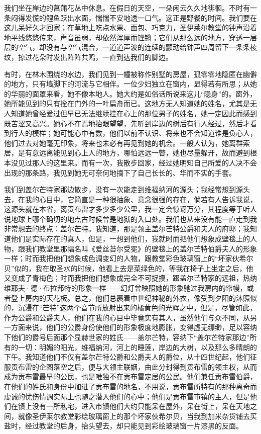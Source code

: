 \par 我们坐在岸边的菖蒲花丛中休息。在假日的天空，一朵闲云久久地徘徊。不时有一条闷得发慌的鲤鱼跃出水面，惴惴不安地透一口气。这正是野餐的时间。我们要在这儿呆好久才回家；在草地上吃点水果、面包、巧克力，圣伊莱尔教堂的钟声沿着地平线悠悠传来，声音虽弱，却依然浑厚而铿锵；它们从那么远的地方，穿透一层层的空气，却没有与空气混合，一道道声波的连续的颤动给钟声四周留下一条条棱纹，掠过花朵时发出阵阵共鸣，一直到达我们的脚边。
\par 有时，在林木围绕的水边，我们见到一幢被称作别墅的房屋，孤零零地隐匿在幽僻的地方，只有墙脚下的河流与它相伴。一位少妇独立在窗内，显得若有所思；从她的华丽的面罩来看，她不像本地人。她大约是如俗话所说来这儿“隐身”的。窗外，她所能见到的只有拴在门外的一叶扁舟而已。这地方无人知道她的姓名，尤其是无人知道她曾经爱过但早已无法继续挂在心上的那位男子的姓名，她一定因此而感到既苦涩又高兴。她心不在焉地抬眼望望，先听到岸边的树后有行人经过，然后才看到行人的模样；她可能心中有数，他们以前不认识、将来也不会知道谁是负心人，他们过去对她毫无印象，将来也未必有再见到她的机会。一般人认为，她离群索居，是有意远离能见到心上人的地方，哪怕远远一瞥，她也尽量躲开，故而避到根本没见过那人的这里来。而有一次，我散步回家，经过她明知自己所爱的人决不会出现的那条路，我见到她无可奈何地摘下了自己长长的、华而不实的手套。
\par 我们到盖尔芒特家那边散步，没有一次能走到维福纳河的源头；我经常想到源头去，在我的心目中，它简直是一种很抽象、意念很强的存在，倘若有人告诉我说，这源头就在本省，离贡布雷才多少多少公里，我一定会惊讶万分，其程度等于听人说地球上哪个确切的地点古时候曾是地狱的入口处。我们也从来没有能一直走到我非常想去的终点：盖尔芒特。我知道，那是领主盖尔芒特公爵和夫人的府邸；我知道他们是实际存在的真人，但是，一想到他们，我就时而把他们想象成壁毯上的人物，跟我们教堂里那幅名叫《爱丝苔尔受冕》的壁毯上的盖尔芒特伯爵夫人的形象一样；时而我把他们想象成色调变幻的人物，跟教堂彩色玻璃窗上的“坏家伙希尔贝”似的，我在取圣水的时候，他看上去是菜绿色的，等我在椅子上坐定之后，他又变成了青梅色；时而我把他们想象成完全不可捉摸，跟盖尔芒特家的远祖，热纳维耶夫·德·布拉邦特的形象一样——幻灯曾映照她的形象驰过我房内的帘幔，或者登上房内的天花板。总之，他们总裹着中世纪神秘的外衣，像受到夕阳的沐照似的，沉浸在“芒特”这两个音节所放射出来的橘黄色的光辉之中。但是，尽管如此，作为公爵和公爵夫人，他们在我的心目中毕竟实有其人，虽然他们与众不同，从另一方面来说，他们的公爵身份使他们的形象极度地膨胀，变得虚无缥缈，足以容纳下他们的爵号后面那个显赫世家的姓氏——盖尔芒特，容纳下“盖尔芒特家那边”所有的一切：明媚的阳光，维福纳河，河上的睡莲，岸边的大树，以及那么多晴朗的下午。我知道他们不仅有盖尔芒特公爵和公爵夫人的爵位，从十四世纪起，他们征服贡布雷的企图落空之后，便与大领主联姻，由此分封得到贡布雷的领主权，从而成为贡布雷最早的公民，也是唯独不在贡布雷定居的公民。他们兼任贡布雷伯爵，在他们的姓氏和身份中加进了贡布雷的地名，不用说，贡布雷所特有的那种离奇而虔诚的忧伤情调实际上也随之潜入他们的心中；他们是贡布雷市镇的主人，但是他们在镇上没有一所私宅，进入市镇他们大约只能呆在屋外，呆在街上，呆在天地之间，就像圣伊莱尔教堂彩绘玻璃窗上的那个坏家伙希尔贝，当我到加米杂货铺去买盐时，经过教堂的后身，抬头望去，却只能见到彩绘玻璃窗一片漆黑的反面。
